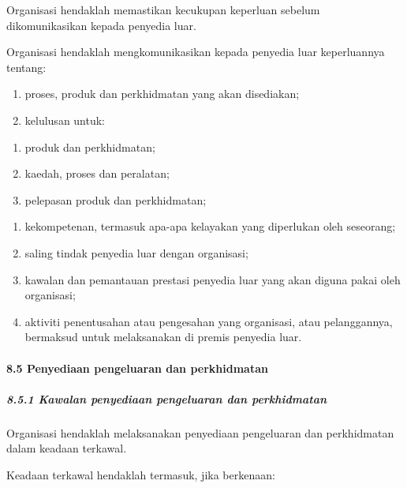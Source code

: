 \documentclass[
]{article}
\begin{document}
Organisasi hendaklah memastikan kecukupan keperluan sebelum
dikomunikasikan kepada penyedia luar.

Organisasi hendaklah mengkomunikasikan kepada penyedia luar keperluannya
tentang:

\begin{enumerate}
\def\labelenumi{\alph{enumi})}
\item
  proses, produk dan perkhidmatan yang akan disediakan;
\item
  kelulusan untuk:
\end{enumerate}

\begin{enumerate}
\def\labelenumi{\arabic{enumi})}
\item
  produk dan perkhidmatan;
\item
  kaedah, proses dan peralatan;
\item
  pelepasan produk dan perkhidmatan;
\end{enumerate}

\begin{enumerate}
\def\labelenumi{\alph{enumi})}
\setcounter{enumi}{2}
\item
  kekompetenan, termasuk apa-apa kelayakan yang diperlukan oleh
  seseorang;
\item
  saling tindak penyedia luar dengan organisasi;
\item
  kawalan dan pemantauan prestasi penyedia luar yang akan diguna pakai
  oleh organisasi;
\item
  aktiviti penentusahan atau pengesahan yang organisasi, atau
  pelanggannya, bermaksud untuk melaksanakan di premis penyedia luar.
\end{enumerate}

\hypertarget{penyediaan-pengeluaran-dan-perkhidmatan}{%
\paragraph{8.5 Penyediaan pengeluaran dan
perkhidmatan}\label{penyediaan-pengeluaran-dan-perkhidmatan}}

\hypertarget{kawalan-penyediaan-pengeluaran-dan-perkhidmatan}{%
\subparagraph{8.5.1 Kawalan penyediaan pengeluaran dan
perkhidmatan}\label{kawalan-penyediaan-pengeluaran-dan-perkhidmatan}}

Organisasi hendaklah melaksanakan penyediaan pengeluaran dan
perkhidmatan dalam keadaan terkawal.

Keadaan terkawal hendaklah termasuk, jika berkenaan:
\end{document}
